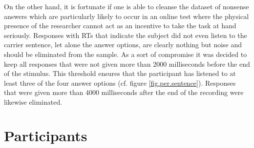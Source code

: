 On the other hand, it is fortunate if one is able to cleanse the dataset of nonsense answers which are particularly likely to occur in an online test where the physical presence of the researcher cannot act as an incentive to take the task at hand seriously.
Responses with RTs that indicate the subject did not even listen to the carrier sentence, let alone the answer options, are clearly nothing but noise and should be eliminated from the sample.
As a sort of compromise it was decided to keep all responses that were not given more than 2000 milliseconds before the end of the stimulus.
This threshold ensures that the participant has listened to at least three of the four answer options (cf. figure \ref{fig.per.sentence}).
Responses that were given more than 4000 milliseconds after the end of the recording were likewise eliminated.

\section{Participants}\label{sec.perc_method.subjects}

